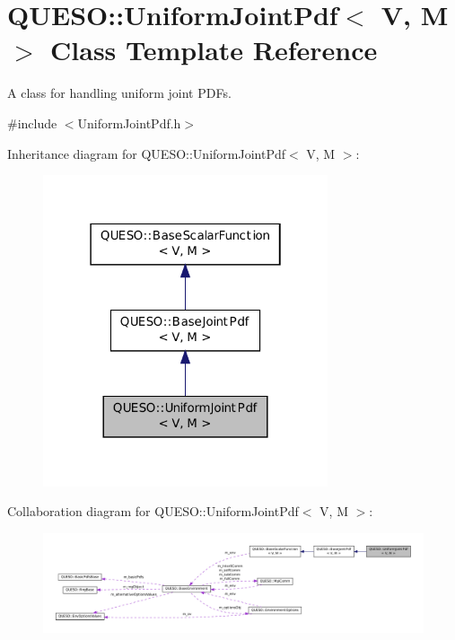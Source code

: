 \hypertarget{class_q_u_e_s_o_1_1_uniform_joint_pdf}{\section{Q\-U\-E\-S\-O\-:\-:Uniform\-Joint\-Pdf$<$ V, M $>$ Class Template Reference}
\label{class_q_u_e_s_o_1_1_uniform_joint_pdf}
}


A class for handling uniform joint P\-D\-Fs.  




{\ttfamily \#include $<$Uniform\-Joint\-Pdf.\-h$>$}



Inheritance diagram for Q\-U\-E\-S\-O\-:\-:Uniform\-Joint\-Pdf$<$ V, M $>$\-:
\nopagebreak
\begin{figure}[H]
\begin{center}
\leavevmode
\includegraphics[width=238pt]{class_q_u_e_s_o_1_1_uniform_joint_pdf__inherit__graph}
\end{center}
\end{figure}


Collaboration diagram for Q\-U\-E\-S\-O\-:\-:Uniform\-Joint\-Pdf$<$ V, M $>$\-:
\nopagebreak
\begin{figure}[H]
\begin{center}
\leavevmode
\includegraphics[width=350pt]{class_q_u_e_s_o_1_1_uniform_joint_pdf__coll__graph}
\end{center}
\end{figure}

